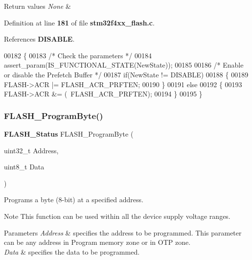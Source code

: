 \begin{DoxyRetVals}{Return values}
{\em None} & \\
\hline
\end{DoxyRetVals}


Definition at line \textbf{ 181} of file \textbf{ stm32f4xx\+\_\+flash.\+c}.



References \textbf{ D\+I\+S\+A\+B\+LE}.


\begin{DoxyCode}
00182 \{
00183   \textcolor{comment}{/* Check the parameters */}
00184   assert_param(IS_FUNCTIONAL_STATE(NewState));
00185   
00186   \textcolor{comment}{/* Enable or disable the Prefetch Buffer */}
00187   \textcolor{keywordflow}{if}(NewState != DISABLE)
00188   \{
00189     FLASH->ACR |= FLASH_ACR_PRFTEN;
00190   \}
00191   \textcolor{keywordflow}{else}
00192   \{
00193     FLASH->ACR &= (~FLASH_ACR_PRFTEN);
00194   \}
00195 \}
\end{DoxyCode}
\mbox{\label{group__FLASH_gac425adf52fe7f229ef6bb893fe386848}} 
\subsubsection{F\+L\+A\+S\+H\+\_\+\+Program\+Byte()}
{\footnotesize\ttfamily \textbf{ F\+L\+A\+S\+H\+\_\+\+Status} F\+L\+A\+S\+H\+\_\+\+Program\+Byte (\begin{DoxyParamCaption}\item[{uint32\+\_\+t}]{Address,  }\item[{uint8\+\_\+t}]{Data }\end{DoxyParamCaption})}



Programs a byte (8-\/bit) at a specified address. 

\begin{DoxyNote}{Note}
This function can be used within all the device supply voltage ranges. 
\end{DoxyNote}

\begin{DoxyParams}{Parameters}
{\em Address} & specifies the address to be programmed. This parameter can be any address in Program memory zone or in O\+TP zone. \\
\hline
{\em Data} & specifies the data to be programmed. \\
\hline
\end{DoxyParams}

